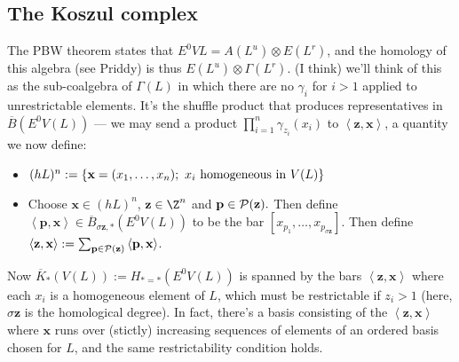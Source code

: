 \documentclass[11pt]{article}
\begin{document}
\subsection*{The Koszul complex}
The PBW theorem states that $E^0VL=A(L^u)\otimes E(L^r)$, and the homology of this algebra (see Priddy) is thus $E(L^u)\otimes \Gamma(L^r)$. (I think) we'll think of this as the sub-coalgebra of $\Gamma(L)$ in which there are no $\gamma_i$ for $i>1$ applied to unrestrictable elements. It's the shuffle product that produces representatives in $\overline{B}(E^0V(L))$ --- we may send a product $\prod_{i=1}^{n}\gamma_{z_i}(x_i)$ to $\left\langle \textbf{z},\textbf{x}\right\rangle$, a quantity we now define:

\begin{itemize}
\setlength{\parindent}{.25in}
\item $(hL)^n:=\{\textbf{x}=(x_1,\ldots,x_n);\ x_i\textup{ homogeneous in }V(L)\}$
\item Choose $\textbf{x}\in(hL)^n$, $\textbf{z}\in\Z^n$ and $\textbf{p}\in\mathcal{P}(\textbf{z}).$ Then define $\left\langle \textbf{p},\textbf{x}\right\rangle\in\overline{B}_{\sigma\textbf{z},*}(E^0V(L))$ to be the bar $[x_{p_1},\ldots,x_{p_{\sigma\textbf{z}}}]$. Then define $\left\langle \textbf{z},\textbf{x}\right\rangle:=\sum_{\textbf{p}\in\mathcal{P}(\textbf{z})}\left\langle \textbf{p},\textbf{x}\right\rangle$. 
\end{itemize}
Now $\overline{K}_*(V(L)):=H_{*=*}(E^0V(L))$ is spanned by the bars $\left\langle \textbf{z},\textbf{x}\right\rangle$ where each $x_i$ is a homogeneous element of $L$, which must be restrictable if $z_i>1$ (here, $\sigma\textbf{z}$ is the homological degree). In fact, there's a basis consisting of the $\left\langle \textbf{z},\textbf{x}\right\rangle$ where $\textbf{x}$ runs over (stictly) increasing sequences of elements of an ordered basis chosen for $L$, and the same restrictability condition holds.
\end{document}
